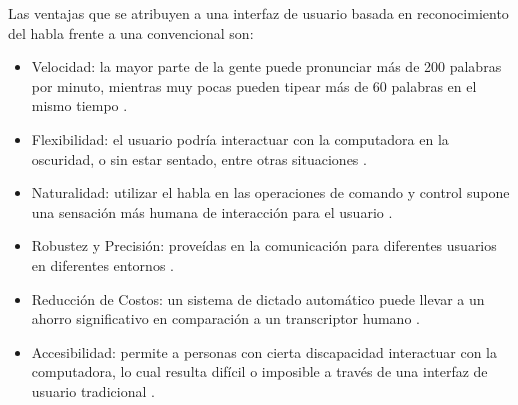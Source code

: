 Las ventajas que se atribuyen a una interfaz de usuario basada en reconocimiento del habla 
frente a una convencional son:

\begin{itemize}
    \item Velocidad: la mayor parte de la gente puede pronunciar m\'{a}s de 200 palabras por minuto, 
     mientras muy pocas pueden tipear m\'{a}s de 60 palabras en el mismo tiempo \cite{RufinerSistema2004}.

    \item Flexibilidad: el usuario podr\'{i}a interactuar con la computadora en la oscuridad, 
     o sin estar sentado, entre otras situaciones \cite{RufinerSistema2004}.
    
    \item Naturalidad: utilizar el habla en las operaciones de comando y control supone una 
     sensaci\'{o}n m\'{a}s humana de interacci\'{o}n para el usuario \cite{BellesiReconocimiento2008}. 
    
    \item Robustez y Precisi\'{o}n: prove\'{i}das en la comunicaci\'{o}n para diferentes usuarios 
     en diferentes entornos \cite{BellesiReconocimiento2008}.
    
    \item Reducci\'{o}n de Costos: un sistema de dictado autom\'{a}tico puede llevar a un ahorro 
    significativo en comparaci\'{o}n a un transcriptor humano \cite{GrassoTheLong2003}.
    
    \item Accesibilidad: permite a personas con cierta discapacidad interactuar con la  computadora, 
     lo cual resulta dif\'{i}cil o imposible a trav\'{e}s de una interfaz de usuario tradicional \cite{GarretUsing2011}.
\end{itemize}